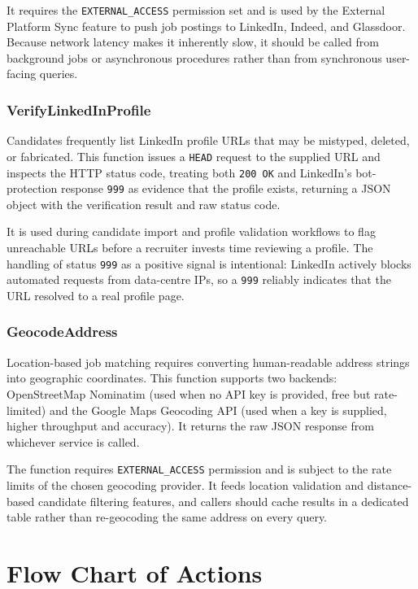 \documentclass[11pt,a4paper]{article}
\begin{document}
It requires the \texttt{EXTERNAL\_ACCESS} permission set and is used by the External Platform Sync feature to push job postings to LinkedIn, Indeed, and Glassdoor. Because network latency makes it inherently slow, it should be called from background jobs or asynchronous procedures rather than from synchronous user-facing queries.

\subsubsection{VerifyLinkedInProfile}
\noindent
Candidates frequently list LinkedIn profile URLs that may be mistyped, deleted, or fabricated. This function issues a \texttt{HEAD} request to the supplied URL and inspects the HTTP status code, treating both \texttt{200 OK} and LinkedIn's bot-protection response \texttt{999} as evidence that the profile exists, returning a JSON object with the verification result and raw status code.

It is used during candidate import and profile validation workflows to flag unreachable URLs before a recruiter invests time reviewing a profile. The handling of status \texttt{999} as a positive signal is intentional: LinkedIn actively blocks automated requests from data-centre IPs, so a \texttt{999} reliably indicates that the URL resolved to a real profile page.

\subsubsection{GeocodeAddress}
\noindent
Location-based job matching requires converting human-readable address strings into geographic coordinates. This function supports two backends: OpenStreetMap Nominatim (used when no API key is provided, free but rate-limited) and the Google Maps Geocoding API (used when a key is supplied, higher throughput and accuracy). It returns the raw JSON response from whichever service is called.

The function requires \texttt{EXTERNAL\_ACCESS} permission and is subject to the rate limits of the chosen geocoding provider. It feeds location validation and distance-based candidate filtering features, and callers should cache results in a dedicated table rather than re-geocoding the same address on every query.


\section{Flow Chart of Actions}
\end{document}
